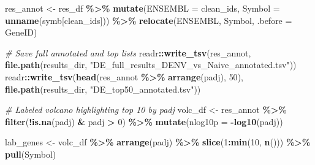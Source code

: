 \documentclass[
]{article}
\newenvironment{Shaded}{\begin{snugshade}}{\end{snugshade}}
\newcommand{\AttributeTok}[1]{\textcolor[rgb]{0.13,0.29,0.53}{#1}}
\newcommand{\CommentTok}[1]{\textcolor[rgb]{0.56,0.35,0.01}{\textit{#1}}}
\newcommand{\DecValTok}[1]{\textcolor[rgb]{0.00,0.00,0.81}{#1}}
\newcommand{\FunctionTok}[1]{\textcolor[rgb]{0.13,0.29,0.53}{\textbf{#1}}}
\newcommand{\NormalTok}[1]{#1}
\newcommand{\OtherTok}[1]{\textcolor[rgb]{0.56,0.35,0.01}{#1}}
\newcommand{\SpecialCharTok}[1]{\textcolor[rgb]{0.81,0.36,0.00}{\textbf{#1}}}
\newcommand{\StringTok}[1]{\textcolor[rgb]{0.31,0.60,0.02}{#1}}
\begin{document}
\begin{Shaded}
\begin{Highlighting}[]
\NormalTok{res\_annot }\OtherTok{\textless{}{-}}\NormalTok{ res\_df }\SpecialCharTok{\%\textgreater{}\%}
  \FunctionTok{mutate}\NormalTok{(}\AttributeTok{ENSEMBL =}\NormalTok{ clean\_ids,}
         \AttributeTok{Symbol  =} \FunctionTok{unname}\NormalTok{(symb[clean\_ids])) }\SpecialCharTok{\%\textgreater{}\%}
  \FunctionTok{relocate}\NormalTok{(ENSEMBL, Symbol, }\AttributeTok{.before =}\NormalTok{ GeneID)}

\CommentTok{\# Save full annotated and top lists}
\NormalTok{readr}\SpecialCharTok{::}\FunctionTok{write\_tsv}\NormalTok{(res\_annot, }\FunctionTok{file.path}\NormalTok{(results\_dir, }\StringTok{"DE\_full\_results\_DENV\_vs\_Naive\_annotated.tsv"}\NormalTok{))}
\NormalTok{readr}\SpecialCharTok{::}\FunctionTok{write\_tsv}\NormalTok{(}\FunctionTok{head}\NormalTok{(res\_annot }\SpecialCharTok{\%\textgreater{}\%} \FunctionTok{arrange}\NormalTok{(padj), }\DecValTok{50}\NormalTok{), }\FunctionTok{file.path}\NormalTok{(results\_dir, }\StringTok{"DE\_top50\_annotated.tsv"}\NormalTok{))}

\CommentTok{\# Labeled volcano highlighting top 10 by padj}
\NormalTok{volc\_df }\OtherTok{\textless{}{-}}\NormalTok{ res\_annot }\SpecialCharTok{\%\textgreater{}\%}
  \FunctionTok{filter}\NormalTok{(}\SpecialCharTok{!}\FunctionTok{is.na}\NormalTok{(padj) }\SpecialCharTok{\&}\NormalTok{ padj }\SpecialCharTok{\textgreater{}} \DecValTok{0}\NormalTok{) }\SpecialCharTok{\%\textgreater{}\%}
  \FunctionTok{mutate}\NormalTok{(}\AttributeTok{nlog10p =} \SpecialCharTok{{-}}\FunctionTok{log10}\NormalTok{(padj))}

\NormalTok{lab\_genes }\OtherTok{\textless{}{-}}\NormalTok{ volc\_df }\SpecialCharTok{\%\textgreater{}\%}
  \FunctionTok{arrange}\NormalTok{(padj) }\SpecialCharTok{\%\textgreater{}\%}
  \FunctionTok{slice}\NormalTok{(}\DecValTok{1}\SpecialCharTok{:}\FunctionTok{min}\NormalTok{(}\DecValTok{10}\NormalTok{, }\FunctionTok{n}\NormalTok{())) }\SpecialCharTok{\%\textgreater{}\%}
  \FunctionTok{pull}\NormalTok{(Symbol)}


\end{Highlighting}
\end{Shaded}
\end{document}
